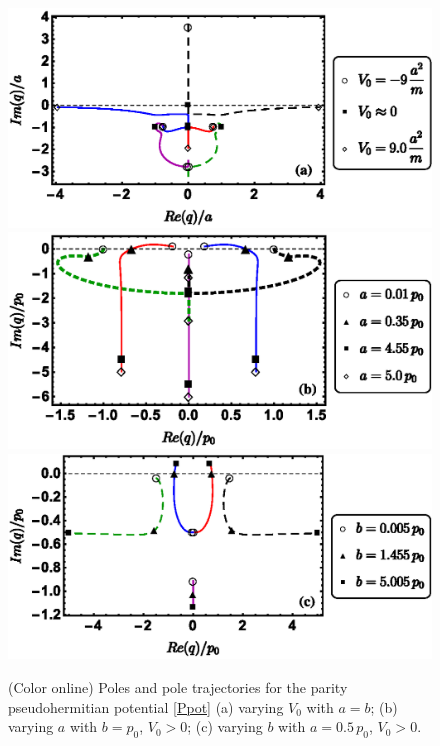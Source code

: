 \begin{figure}[h]
\includegraphics[width=1.0\linewidth]{Figures/IVSymEigenvalsVaryingV0new.eps}
\includegraphics[width=1.0\linewidth]{Figures/IVSymEigenvalsVaryinganew.eps}
\includegraphics[width=1.0\linewidth]{Figures/IVSymEigenvalsVaryingbnew.eps}
\caption{(Color online) Poles and pole trajectories for the parity pseudohermitian potential \eqref{Ppot} (a) varying $V_0$ with $a=b$; (b) varying $a$ with $b=p_0$, $V_0>0$; (c) varying $b$ with $a=0.5\, p_0$, $V_0>0$.}
\label{fig:IVSymEigenvals}
\end{figure}



